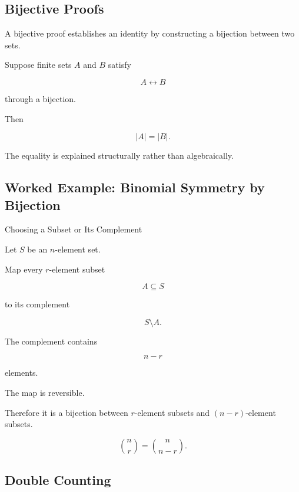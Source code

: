 \subsection{Bijective Proofs}
\label{subsec:bijective-proofs}

A bijective proof establishes an identity by constructing a bijection
between two sets.

Suppose finite sets \(A\) and \(B\) satisfy

\[
A\leftrightarrow B
\]

through a bijection.

Then

\[
\boxed{
|A|=|B|.
}
\]

The equality is explained structurally rather than algebraically.

\subsection{Worked Example: Binomial Symmetry by Bijection}
\label{subsec:worked-binomial-bijection}

\begin{workedexamplebox}{Choosing a Subset or Its Complement}

Let \(S\) be an \(n\)-element set.

Map every \(r\)-element subset

\[
A\subseteq S
\]

to its complement

\[
S\setminus A.
\]

The complement contains

\[
n-r
\]

elements.

The map is reversible.

Therefore it is a bijection between \(r\)-element subsets and
\((n-r)\)-element subsets.

\begin{answerbox}
\[
\boxed{
\binom{n}{r}
=
\binom{n}{n-r}.
}
\]
\end{answerbox}

\end{workedexamplebox}

\subsection{Double Counting}
\label{subsec:double-counting}

